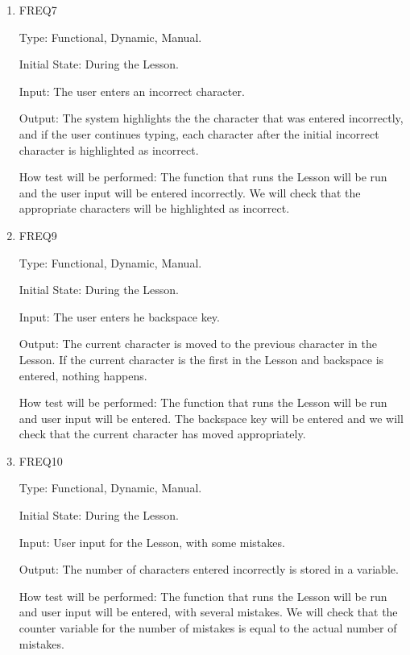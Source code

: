 \documentclass[12pt, titlepage]{article}
\begin{document}
\begin{enumerate}

\item{FREQ7\\}

Type: Functional, Dynamic, Manual.
					
Initial State: During the Lesson.
					
Input: The user enters an incorrect character.
					
Output: The system highlights the the character that was entered incorrectly, and if the user continues typing, each character after the initial incorrect character is highlighted as incorrect.
					
How test will be performed: The function that runs the Lesson will be run and the user input will be entered incorrectly. We will check that the appropriate characters will be highlighted as incorrect.

\item{FREQ9\\}

Type: Functional, Dynamic, Manual.
					
Initial State: During the Lesson.
					
Input: The user enters he backspace key.
					
Output: The current character is moved to the previous character in the Lesson. If the current character is the first in the Lesson and backspace is entered, nothing happens.
					
How test will be performed: The function that runs the Lesson will be run and user input will be entered. The backspace key will be entered and we will check that the current character has moved appropriately.

\item{FREQ10\\}

Type: Functional, Dynamic, Manual.
					
Initial State: During the Lesson.
					
Input: User input for the Lesson, with some mistakes.
					
Output: The number of characters entered incorrectly is stored in a variable.
					
How test will be performed: The function that runs the Lesson will be run and user input will be entered, with several mistakes. We will check that the counter variable for the number of mistakes is equal to the actual number of mistakes.
\end{enumerate}
\end{document}
